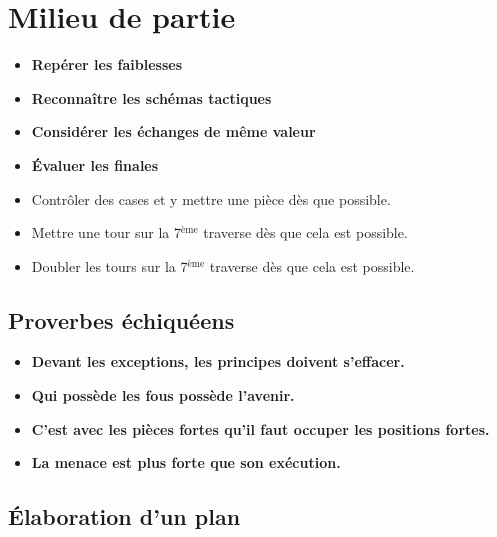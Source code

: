 

%

\section{Milieu de partie}

\begin{itemize}[leftmargin=4.7cm, label=, itemsep=0pt]%
\item  {\bf Repérer les faiblesses}
\item  {\bf Reconnaître les schémas tactiques}
\item  {\bf Considérer les échanges de même valeur}
\item  {\bf Évaluer les finales}
\end{itemize}

\begin{itemize}[leftmargin=2.7cm, label=, itemsep=0pt]%
\item  { Contrôler des cases et y mettre une pièce dès que possible.}
\item  { Mettre une tour sur la 7$^\text{ème}$ traverse dès que cela est possible.}
\item  { Doubler les tours sur la 7$^\text{ème}$ traverse dès que cela est possible.}
\end{itemize}

\subsection{Proverbes échiquéens}

\begin{itemize}[leftmargin=2.7cm, label=, itemsep=0pt]%
\item  {\bf Devant les exceptions, les principes doivent s'effacer.}
\item  {\bf Qui possède les fous possède l'avenir.}
\item  {\bf C'est avec les pièces fortes qu'il faut occuper les positions fortes.}
\item  {\bf La menace est plus forte que son exécution.}
\end{itemize}

\subsection{Élaboration d'un plan}

